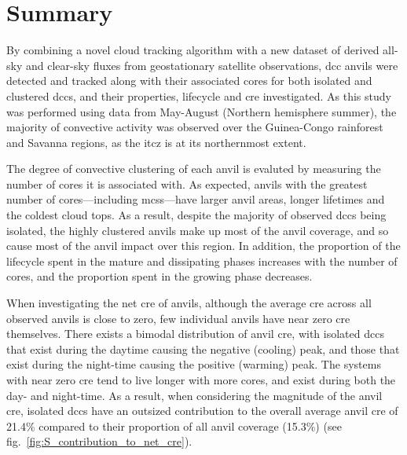 \section{Summary}  %

By combining a novel cloud tracking algorithm with a new dataset of derived all-sky and clear-sky fluxes from geostationary satellite observations, \acrshort{dcc} anvils were detected and tracked along with their associated cores for both isolated and clustered \acrshort{dcc}s, and their properties, lifecycle and \acrshort{cre} investigated. 
As this study was performed using data from May-August (Northern hemisphere summer), the majority of convective activity was observed over the Guinea-Congo rainforest and Savanna regions, as the \acrshort{itcz} is at its northernmost extent.

The degree of convective clustering of each anvil is evaluted by measuring the number of cores it is associated with. 
As expected, anvils with the greatest number of cores---including \acrshort{mcs}s---have larger anvil areas, longer lifetimes and the coldest cloud tops. 
As a result, despite the majority of observed \acrshort{dcc}s being isolated, the highly clustered anvils make up most of the anvil coverage, and so cause most of the anvil impact over this region. 
In addition, the proportion of the lifecycle spent in the mature and dissipating phases increases with the number of cores, and the proportion spent in the growing phase decreases.

When investigating the net \acrshort{cre} of anvils, although the average \acrshort{cre} across all observed anvils is close to zero, few individual anvils have near zero \acrshort{cre} themselves. 
There exists a bimodal distribution of anvil \acrshort{cre}, with isolated \acrshort{dcc}s that exist during the daytime causing the negative (cooling) peak, and those that exist during the night-time causing the positive (warming) peak. 
The systems with near zero \acrshort{cre} tend to live longer with more cores, and exist during both the day- and night-time. 
As a result, when considering the magnitude of the anvil \acrshort{cre}, isolated \acrshort{dcc}s have an outsized contribution to the overall average anvil \acrshort{cre} of 21.4\% compared to their proportion of all anvil coverage (15.3\%) (see fig.~\ref{fig:S_contribution_to_net_cre}).

